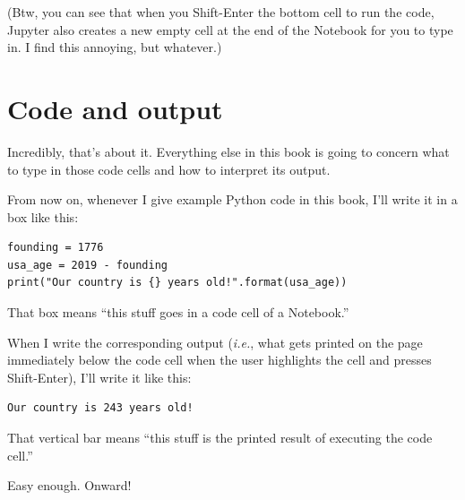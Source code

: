 (Btw, you can see that when you Shift-Enter the bottom cell to run the code,
Jupyter also creates a new empty cell at the end of the Notebook for you to
type in. I find this annoying, but whatever.)

\section{Code and output}

Incredibly, that's about it. Everything else in this book is going to concern
what to type in those code cells and how to interpret its output.

From now on, whenever I give example Python code in this book, I'll write it in
a box like this:

\begin{Verbatim}[fontsize=\small,samepage=true,frame=single,framesep=3mm]
founding = 1776
usa_age = 2019 - founding
print("Our country is {} years old!".format(usa_age))
\end{Verbatim}

That box means ``this stuff goes in a code cell of a Notebook.''

When I write the corresponding output (\textit{i.e.}, what gets printed on the
page immediately below the code cell when the user highlights the cell and
presses Shift-Enter), I'll write it like this:

\begin{Verbatim}[fontsize=\small,samepage=true,frame=leftline,framesep=5mm,framerule=1mm]
Our country is 243 years old!
\end{Verbatim}

That vertical bar means ``this stuff is the printed result of executing the
code cell.''

Easy enough. Onward!
